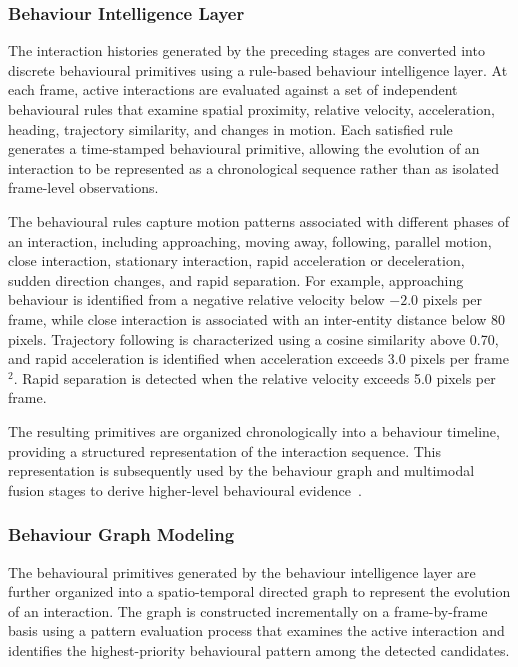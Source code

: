 \documentclass[conference]{IEEEtran}
\begin{document}
\subsubsection{Behaviour Intelligence Layer}

The interaction histories generated by the preceding stages are converted
into discrete behavioural primitives using a rule-based behaviour
intelligence layer. At each frame, active interactions are evaluated
against a set of independent behavioural rules that examine spatial
proximity, relative velocity, acceleration, heading, trajectory
similarity, and changes in motion. Each satisfied rule generates a
time-stamped behavioural primitive, allowing the evolution of an
interaction to be represented as a chronological sequence rather than
as isolated frame-level observations.

The behavioural rules capture motion patterns associated with different
phases of an interaction, including approaching, moving away, following,
parallel motion, close interaction, stationary interaction, rapid
acceleration or deceleration, sudden direction changes, and rapid
separation. For example, approaching behaviour is identified from a
negative relative velocity below $-2.0$ pixels per frame, while close
interaction is associated with an inter-entity distance below 80 pixels.
Trajectory following is characterized using a cosine similarity above
0.70, and rapid acceleration is identified when acceleration exceeds
3.0 pixels per frame$^2$. Rapid separation is detected when the relative
velocity exceeds 5.0 pixels per frame.

The resulting primitives are organized chronologically into a behaviour
timeline, providing a structured representation of the interaction
sequence. This representation is subsequently used by the behaviour
graph and multimodal fusion stages to derive higher-level behavioural
evidence~\cite{yan2018stgcn}.

\subsubsection{Behaviour Graph Modeling}

The behavioural primitives generated by the behaviour intelligence layer
are further organized into a spatio-temporal directed graph to represent
the evolution of an interaction. The graph is constructed incrementally
on a frame-by-frame basis using a pattern evaluation process that
examines the active interaction and identifies the highest-priority
behavioural pattern among the detected candidates.
\end{document}
